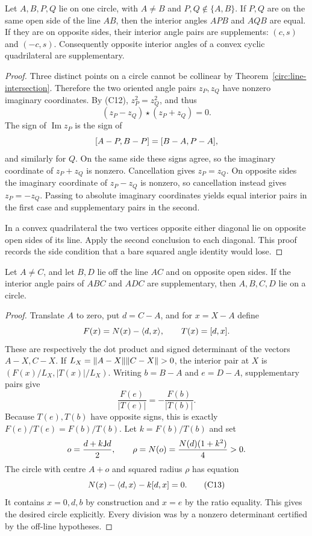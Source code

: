 \begin{theorem}
\label{circ:same-segment}
Let $A,B,P,Q$ lie on one circle, with $A\ne B$ and $P,Q\notin\{A,B\}$.
If $P,Q$ are on the same open side of the line $AB$, then the interior
angles $APB$ and $AQB$ are equal.  If they are on opposite sides, their
interior angle pairs are supplements: $(c,s)$ and $(-c,s)$.
Consequently opposite interior angles of a convex cyclic quadrilateral
are supplementary.
\end{theorem}
\begin{proof}
Three distinct points on a circle cannot be collinear by
Theorem~\ref{circ:line-intersection}.  Therefore the two oriented angle
pairs $z_P,z_Q$ have nonzero imaginary coordinates.  By (C12),
$z_P^2=z_Q^2$, and thus
\[
 (z_P-z_Q)\star(z_P+z_Q)=0.
\]
The sign of $\operatorname{Im}z_P$ is the sign of
\[
 [A-P,B-P]=[B-A,P-A],
\]
and similarly for $Q$.  On the same side these signs agree, so the
imaginary coordinate of $z_P+z_Q$ is nonzero.  Cancellation gives
$z_P=z_Q$.  On opposite sides the imaginary coordinate of $z_P-z_Q$ is
nonzero, so cancellation instead gives $z_P=-z_Q$.  Passing to absolute
imaginary coordinates yields equal interior pairs in the first case and
supplementary pairs in the second.

In a convex quadrilateral the two vertices opposite either diagonal lie
on opposite open sides of its line.  Apply the second conclusion to each
diagonal.  This proof records the side condition that a bare squared
angle identity would lose.
\end{proof}

\begin{theorem}
\label{circ:cyclic-converse}
Let $A\ne C$, and let $B,D$ lie off the line $AC$ and on opposite open
sides.  If the interior angle pairs of $ABC$ and $ADC$ are supplementary,
then $A,B,C,D$ lie on a circle.
\end{theorem}
\begin{proof}
Translate $A$ to zero, put $d=C-A$, and for $x=X-A$ define
\[
 F(x)=N(x)-\langle d,x\rangle,\qquad T(x)=[d,x].
\]
These are respectively the dot product and signed determinant of the
vectors $A-X,C-X$.  If $L_X=\lVert A-X\rVert\lVert C-X\rVert>0$, the interior pair at
$X$ is $(F(x)/L_X,|T(x)|/L_X)$.
Writing $b=B-A$ and $e=D-A$, supplementary pairs give
\[
 \frac{F(e)}{|T(e)|}=-\frac{F(b)}{|T(b)|}.
\]
Because $T(e),T(b)$ have opposite signs, this is exactly
$F(e)/T(e)=F(b)/T(b)$.  Let $k=F(b)/T(b)$ and set
\[
 o=\frac{d+k\mathsf J d}{2},\qquad \rho=N(o)
       =\frac{N(d)(1+k^2)}{4}>0.
\]
The circle with centre $A+o$ and squared radius $\rho$ has equation
\[
 N(x)-\langle d,x\rangle-k[d,x]=0.                    \tag{C13}
\]
It contains $x=0,d,b$ by construction and $x=e$ by the ratio equality.
This gives the desired circle explicitly.  Every division was by a
nonzero determinant certified by the off-line hypotheses.
\end{proof}

